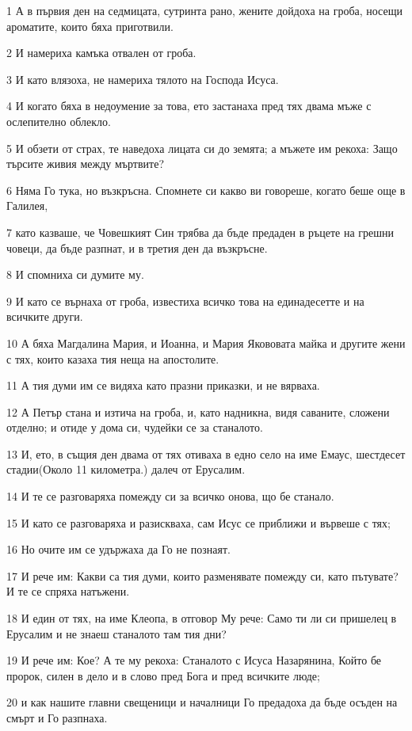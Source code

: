\par 1 А в първия ден на седмицата, сутринта рано, жените дойдоха на гроба, носещи ароматите, които бяха приготвили.
\par 2 И намериха камъка отвален от гроба.
\par 3 И като влязоха, не намериха тялото на Господа Исуса.
\par 4 И когато бяха в недоумение за това, ето застанаха пред тях двама мъже с ослепително облекло.
\par 5 И обзети от страх, те наведоха лицата си до земята; а мъжете им рекоха: Защо търсите живия между мъртвите?
\par 6 Няма Го тука, но възкръсна. Спомнете си какво ви говореше, когато беше още в Галилея,
\par 7 като казваше, че Човешкият Син трябва да бъде предаден в ръцете на грешни човеци, да бъде разпнат, и в третия ден да възкръсне.
\par 8 И спомниха си думите му.
\par 9 И като се върнаха от гроба, известиха всичко това на единадесетте и на всичките други.
\par 10 А бяха Магдалина Мария, и Иоанна, и Мария Якововата майка и другите жени с тях, които казаха тия неща на апостолите.
\par 11 А тия думи им се видяха като празни приказки, и не вярваха.
\par 12 А Петър стана и изтича на гроба, и, като надникна, видя саваните, сложени отделно; и отиде у дома си, чудейки се за станалото.
\par 13 И, ето, в същия ден двама от тях отиваха в едно село на име Емаус, шестдесет стадии(Около 11 километра.) далеч от Ерусалим.
\par 14 И те се разговаряха помежду си за всичко онова, що бе станало.
\par 15 И като се разговаряха и разискваха, сам Исус се приближи и вървеше с тях;
\par 16 Но очите им се удържаха да Го не познаят.
\par 17 И рече им: Какви са тия думи, които разменявате помежду си, като пътувате? И те се спряха натъжени.
\par 18 И един от тях, на име Клеопа, в отговор Му рече: Само ти ли си пришелец в Ерусалим и не знаеш станалото там тия дни?
\par 19 И рече им: Кое? А те му рекоха: Станалото с Исуса Назарянина, Който бе пророк, силен в дело и в слово пред Бога и пред всичките люде;
\par 20 и как нашите главни свещеници и началници Го предадоха да бъде осъден на смърт и Го разпнаха.
